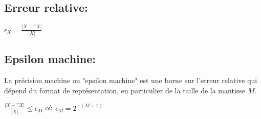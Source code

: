 \documentclass[11pt]{article}
\begin{document}
\subsection{Erreur relative:}
$\epsilon_X = \frac{|X-\^X|}{|X|}$ \\

\subsection{Epsilon machine:}
La précision machine ou "epsilon machine" est une borne sur l'erreur relative qui 
dépend du format de représentation, en particulier de la taille de la mantisse $M$. \\
\begin{center}
    $\frac{|X-\^X|}{|X|} \leq \epsilon_M$ où $\epsilon_M = 2^{-(M+1)}$
\end{center}
\end{document}
